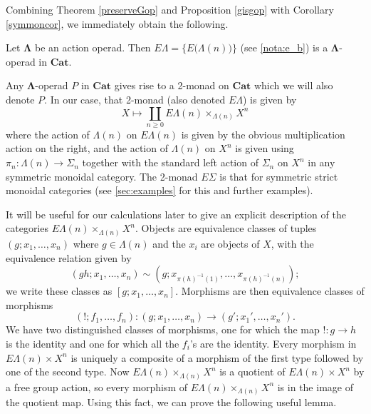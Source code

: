 \documentclass{amsbook} %
\newcommand{\mb}{\mathbf}
\numberwithin{section}{chapter}
\begin{document}
Combining Theorem \ref{preserveGop} and Proposition \ref{gisgop} with Corollary \ref{symmoncor}, we immediately obtain the following.

\begin{cor}\label{cor:elambda_lambdaop}
Let $\mb{\Lambda}$ be an action operad.  Then $E\Lambda = \{ E\big(\Lambda(n)\big) \}$ (see \cref{nota:e_b}) is a $\mb{\Lambda}$-operad in $\mb{Cat}$.
\end{cor}

Any $\mb{\Lambda}$-operad $P$ in $\mb{Cat}$ gives rise to a 2-monad on $\mb{Cat}$ which we will also denote $P$.  In our case, that 2-monad (also denoted $E\Lambda$) is given by
\[
X \mapsto \coprod_{n \geq 0} E\Lambda(n) \times_{\Lambda(n)} X^{n}
\]
where the action of $\Lambda(n)$ on $E\Lambda(n)$ is given by the obvious multiplication action on the right, and the action of $\Lambda(n)$ on $X^{n}$ is given using $\pi_{n}:\Lambda(n) \rightarrow \Sigma_{n}$ together with the standard left action of $\Sigma_{n}$ on $X^{n}$ in any symmetric monoidal category.  The 2-monad $E\Sigma$ is that for symmetric strict monoidal categories (see \cref{sec:examples} for this and further examples).

It will be useful for our calculations later to give an explicit description of the categories $E\Lambda(n) \times_{\Lambda(n)} X^{n}$.  Objects are equivalence classes of tuples $(g; x_1, \ldots, x_n)$ where $g \in \Lambda(n)$ and the $x_{i}$ are objects of $X$, with the equivalence relation given by
\[
(gh; x_1, \ldots, x_n) \sim (g; x_{\pi(h)^{-1}(1)}, \ldots, x_{\pi(h)^{-1}(n)});
\]
we write these classes as $[g; x_1, \ldots, x_n]$.  Morphisms are then equivalence classes of morphisms
\[
(!; f_1, \ldots, f_n): (g; x_1, \ldots, x_n) \to (g'; x_1', \ldots, x_n').
\]
We have two distinguished classes of morphisms, one for which the map $!: g \to h$ is the identity and one for which all the $f_{i}$'s are the identity.  Every morphism in $E\Lambda(n) \times X^{n}$ is uniquely a composite of a  morphism of the first type followed by one of the second type.  Now $E\Lambda(n) \times_{\Lambda(n)} X^{n}$ is a quotient of $E\Lambda(n) \times X^{n}$ by a free group action, so every morphism of $E\Lambda(n) \times_{\Lambda(n)} X^{n}$ is in the image of the quotient map.  Using this fact, we can prove the following useful lemma.
\end{document}
